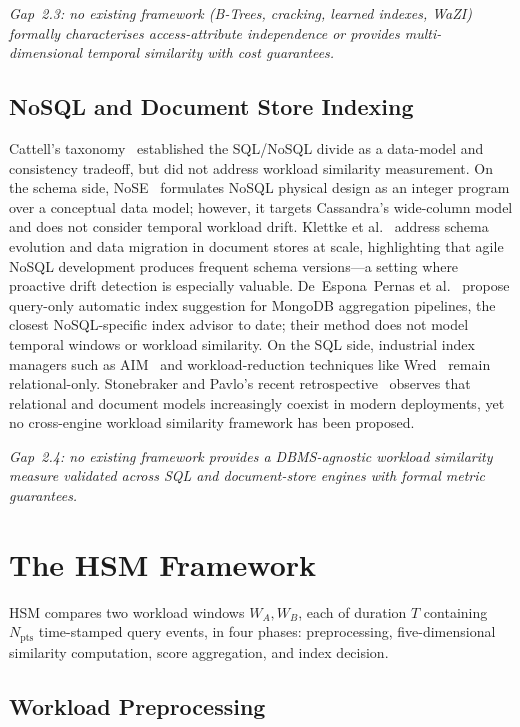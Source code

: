 \documentclass[10pt,journal,compsoc]{IEEEtran}
\newcommand{\Npts}{N_{\mathrm{pts}}}
\begin{document}
\emph{Gap~2.3: no existing framework (B-Trees, cracking, learned indexes,
WaZI) formally characterises access-attribute independence or provides
multi-dimensional temporal similarity with cost guarantees.}

\subsection{NoSQL and Document Store Indexing}

Cattell's taxonomy~\cite{Cattell2011NoSQL} established the SQL/NoSQL
divide as a data-model and consistency tradeoff, but did not address
workload similarity measurement. On the schema side,
NoSE~\cite{Mior2017NoSE} formulates NoSQL physical design as an integer
program over a conceptual data model; however, it targets Cassandra's
wide-column model and does not consider temporal workload drift.
Klettke et al.~\cite{Klettke2016SchemaEvol} address schema evolution
and data migration in document stores at scale, highlighting that
agile NoSQL development produces frequent schema versions---a setting
where proactive drift detection is especially valuable.
De~Espona~Pernas et al.~\cite{deEspona2023MongoIndex} propose
query-only automatic index suggestion for MongoDB aggregation
pipelines, the closest NoSQL-specific index advisor to date; their
method does not model temporal windows or workload similarity.
On the SQL side, industrial index managers such as
AIM~\cite{Yadav2023AIM} and workload-reduction techniques like
Wred~\cite{Brucato2024Wred} remain relational-only.
Stonebraker and Pavlo's recent retrospective~\cite{Stonebraker2024WGA}
observes that relational and document models increasingly coexist in
modern deployments, yet no cross-engine workload similarity framework
has been proposed.

\emph{Gap~2.4: no existing framework provides a DBMS-agnostic workload
similarity measure validated across SQL and document-store engines with
formal metric guarantees.}

\section{The HSM Framework}

HSM compares two workload windows $W_A, W_B$, each of duration $T$
containing $\Npts$ time-stamped query events, in four phases:
preprocessing, five-dimensional similarity computation, score
aggregation, and index decision.

\subsection{Workload Preprocessing}
\end{document}
